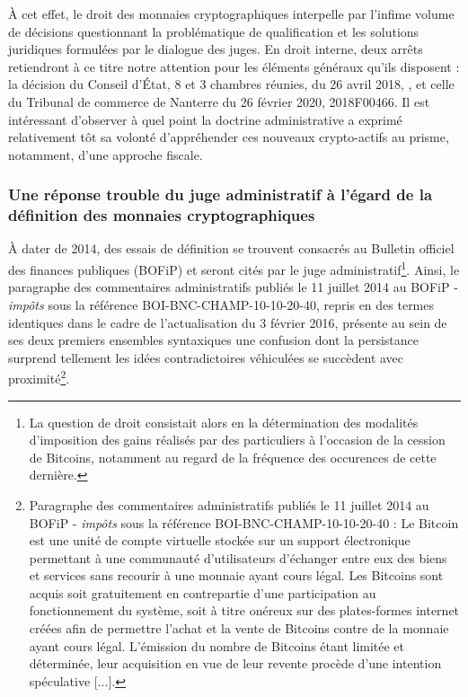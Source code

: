 {À cet effet, le droit des monnaies cryptographiques interpelle par l'infime volume de décisions questionnant la problématique de qualification et les solutions juridiques formulées par le dialogue des juges. En droit interne, deux arrêts retiendront à ce titre notre attention pour les éléments généraux qu'ils disposent : la décision du Conseil d'État, 8 et 3 chambres réunies, du 26 avril 2018, , et celle du Tribunal de commerce de Nanterre du 26 février 2020, \no 2018F00466. Il est intéressant d'observer à quel point la doctrine administrative a exprimé relativement tôt sa volonté d'appréhender ces nouveaux crypto-actifs au prisme, notamment, d'une approche fiscale.\par

\subsubsection{Une réponse trouble du juge administratif à l'égard de la définition des monnaies cryptographiques}

À dater de 2014, des essais de définition se trouvent consacrés au Bulletin officiel des finances publiques (\acrshort{BOFiP}) et seront cités par le juge administratif\footnote{La question de droit consistait alors en la détermination des modalités d’imposition des gains réalisés par des particuliers à l’occasion de la cession de Bitcoins, notamment au regard de la fréquence des occurences de cette dernière.}. Ainsi, le paragraphe  des commentaires administratifs publiés le 11 juillet 2014 au BOFiP - \emph{impôts} sous la référence BOI-BNC-CHAMP-10-10-20-40, repris en des termes identiques dans le cadre de l'actualisation du 3 février 2016, présente au sein de ses deux premiers ensembles syntaxiques une confusion dont la persistance surprend tellement les idées contradictoires véhiculées se succèdent avec proximité\footnote{Paragraphe  des commentaires administratifs publiés le 11 juillet 2014 au BOFiP - \emph{impôts} sous la référence BOI-BNC-CHAMP-10-10-20-40 : \og Le Bitcoin est une unité de compte virtuelle stockée sur un support électronique permettant à une communauté d'utilisateurs d'échanger entre eux des biens et services sans recourir à une monnaie ayant cours légal. Les Bitcoins sont acquis soit gratuitement en contrepartie d'une participation au fonctionnement du système, soit à titre onéreux sur des plates-formes internet créées afin de permettre l'achat et la vente de Bitcoins contre de la monnaie ayant cours légal. L'émission du nombre de Bitcoins étant limitée et déterminée, leur acquisition en vue de leur revente procède d'une intention spéculative [...]\fg{}.}.\par

}
